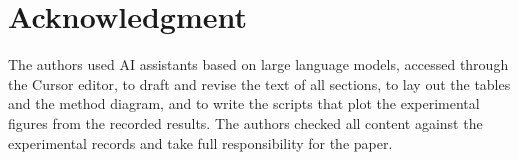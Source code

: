 \documentclass[journal,10pt]{IEEEtran}
\begin{document}









\section*{Acknowledgment}
The authors used AI assistants based on large language models, accessed through the Cursor editor, to draft and revise the text of all sections, to lay out the tables and the method diagram, and to write the scripts that plot the experimental figures from the recorded results. The authors checked all content against the experimental records and take full responsibility for the paper.



\end{document}
